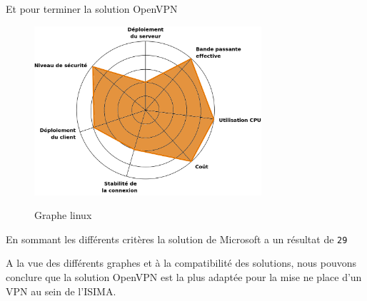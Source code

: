 Et pour terminer la solution OpenVPN

\begin{figure}[H]
	\begin{center}
		\includegraphics[width=0.75\textwidth]{partie_3/images/linux.png}\\
	\end{center}
	\caption{Graphe linux}
	\label{Graphe linux}
\end{figure}

En sommant les différents critères la solution de Microsoft a un résultat de \verb|29|


A la vue des différents graphes et à la compatibilité des solutions, nous pouvons conclure que la solution OpenVPN est la plus adaptée pour la mise ne place d'un VPN au sein de l'ISIMA.

